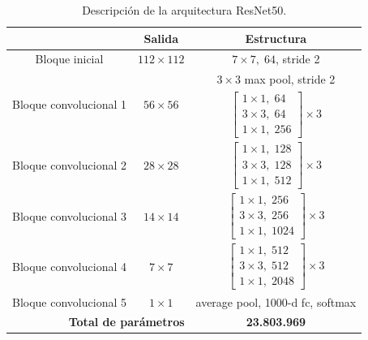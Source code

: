 \bgroup
\begin{table}[htp]
  \scriptsize
  \begin{center}
    \begin{tabular}[b]{|c|c|c|}
      \hline
      \rowcolor[HTML]{FFC702}
      \multicolumn{1}{|c|}{\textbf{Capa}} & \multicolumn{1}{c|}{\textbf{Salida}}  &
      \multicolumn{1}{c|}{\textbf{Estructura}} \\
      \hline
      Bloque inicial & $112\times112$ & $7\times7,\; 64$, stride 2 \\ 
      \hline 
      \multirow{2}{*}{Bloque convolucional 1} & \multirow{2}{*}{$56\times56$} & $3\times3$ max pool, stride 2 \\ 
      \cline{3-3}
                                              & & $\begin{bmatrix}1\times1,\; 64 \\ 3\times3,\; 64 \\ 1\times1,\; 256 \end{bmatrix}\times 3$ \\ 
      \hline
      Bloque convolucional 2 & $28\times28$ & $\begin{bmatrix}1\times1,\; 128 \\ 3\times3,\; 128 \\ 1\times1,\; 512 \end{bmatrix}  \times 3 $\\ 
      \hline
      Bloque convolucional 3 & $14\times14$ & $\begin{bmatrix}1\times1,\; 256 \\ 3\times3,\; 256 \\ 1\times1,\; 1024 \end{bmatrix} \times 3$ \\ 
      \hline
      Bloque convolucional 4 & $7\times7$   & $\begin{bmatrix}1\times1,\; 512 \\ 3\times3,\; 512 \\ 1\times1,\; 2048 \end{bmatrix}  \times 3 $\\ 
      \hline
      Bloque convolucional 5 & $1\times1$   & average pool, 1000-d fc, softmax\\ 
      \hline
      \multicolumn{2}{|r|}{\cellcolor[HTML]{FFC702}\textbf{Total de parámetros}} & \textbf{23.803.969}\\
      \hline 
      \end{tabular}
  \end{center}
  \caption{Descripción de la arquitectura ResNet50\cite{ResNet}.}
  \label{tab:ResNet50}
\end{table}
\egroup

